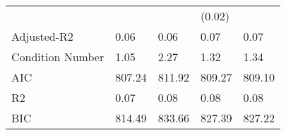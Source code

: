 \begin{table}
\begin{center}
\begin{tabular}{lllll}
                                               &        &         & (0.02)  &          \\
Adjusted-R2                                    & 0.06   & 0.06    & 0.07    & 0.07     \\
Condition Number                               & 1.05   & 2.27    & 1.32    & 1.34     \\
AIC                                            & 807.24 & 811.92  & 809.27  & 809.10   \\
R2                                             & 0.07   & 0.08    & 0.08    & 0.08     \\
BIC                                            & 814.49 & 833.66  & 827.39  & 827.22   \\
\hline
\end{tabular}
\end{center}
\end{table}